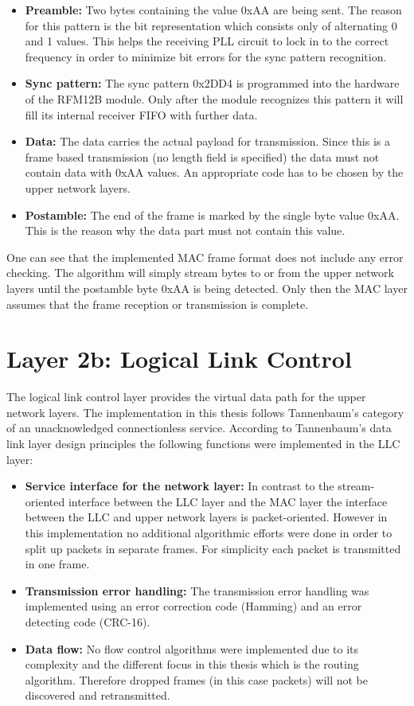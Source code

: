 \begin{itemize}
    \item \textbf{Preamble:} Two bytes containing the value 0xAA are being sent. The reason for this pattern is the bit representation which consists only of alternating 0 and 1 values. This helps the receiving PLL circuit to lock in to the correct frequency in order to minimize bit errors for the sync pattern recognition.
    \item \textbf{Sync pattern:} The sync pattern 0x2DD4 is programmed into the hardware of the RFM12B module. Only after the module recognizes this pattern it will fill its internal receiver FIFO with further data.
    \item \textbf{Data:} The data carries the actual payload for transmission. Since this is a frame based transmission (no length field is specified) the data must not contain data with 0xAA values. An appropriate code has to be chosen by the upper network layers.
    \item \textbf{Postamble:} The end of the frame is marked by the single byte value 0xAA. This is the reason why the data part must not contain this value.
\end{itemize}

One can see that the implemented MAC frame format does not include any error checking. The algorithm will simply stream bytes to or from the upper network layers until the postamble byte 0xAA is being detected. Only then the MAC layer assumes that the frame reception or transmission is complete.

\section{Layer 2b: Logical Link Control}%
The logical link control layer provides the virtual data path for the upper network layers. The implementation in this thesis follows Tannenbaum's \cite{tannenbaum} category of an unacknowledged connectionless service. According to Tannenbaum's data link layer design principles the following functions were implemented in the LLC layer:

\begin{itemize}
    \item \textbf{Service interface for the network layer:} In contrast to the stream-oriented interface between the LLC layer and the MAC layer the interface between the LLC and upper network layers is packet-oriented. However in this implementation no additional algorithmic efforts were done in order to split up packets in separate frames. For simplicity each packet is transmitted in one frame.
    \item \textbf{Transmission error handling:} The transmission error handling was implemented using an error correction code (Hamming) and an error detecting code (CRC-16).
    \item \textbf{Data flow:} No flow control algorithms were implemented due to its complexity and the different focus in this thesis which is the routing algorithm. Therefore dropped frames (in this case packets) will not be discovered and retransmitted.
\end{itemize}

